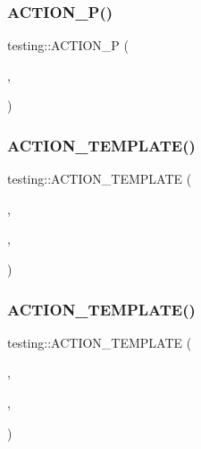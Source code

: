 \subsubsection{\texorpdfstring{ACTION\_P()}{ACTION\_P()}}
{\footnotesize\ttfamily testing\+::\+A\+C\+T\+I\+O\+N\+\_\+P (\begin{DoxyParamCaption}\item[{Return\+Pointee}]{,  }\item[{pointer}]{ }\end{DoxyParamCaption})}

\mbox{\label{namespacetesting_a109d48f969260878ed1e743006196992}} 
\subsubsection{\texorpdfstring{ACTION\_TEMPLATE()}{ACTION\_TEMPLATE()}\hspace{0.1cm}{\footnotesize\ttfamily [1/28]}}
{\footnotesize\ttfamily testing\+::\+A\+C\+T\+I\+O\+N\+\_\+\+T\+E\+M\+P\+L\+A\+TE (\begin{DoxyParamCaption}\item[{Return\+Arg}]{,  }\item[{H\+A\+S\+\_\+1\+\_\+\+T\+E\+M\+P\+L\+A\+T\+E\+\_\+\+P\+A\+R\+A\+MS(int, k)}]{,  }\item[{A\+N\+D\+\_\+0\+\_\+\+V\+A\+L\+U\+E\+\_\+\+P\+A\+R\+A\+MS()}]{ }\end{DoxyParamCaption})}

\mbox{\label{namespacetesting_a0478a3464d31f6726d5bc47b1be46491}} 
\subsubsection{\texorpdfstring{ACTION\_TEMPLATE()}{ACTION\_TEMPLATE()}\hspace{0.1cm}{\footnotesize\ttfamily [2/28]}}
{\footnotesize\ttfamily testing\+::\+A\+C\+T\+I\+O\+N\+\_\+\+T\+E\+M\+P\+L\+A\+TE (\begin{DoxyParamCaption}\item[{Save\+Arg}]{,  }\item[{H\+A\+S\+\_\+1\+\_\+\+T\+E\+M\+P\+L\+A\+T\+E\+\_\+\+P\+A\+R\+A\+MS(int, k)}]{,  }\item[{A\+N\+D\+\_\+1\+\_\+\+V\+A\+L\+U\+E\+\_\+\+P\+A\+R\+A\+MS(pointer)}]{ }\end{DoxyParamCaption})}

